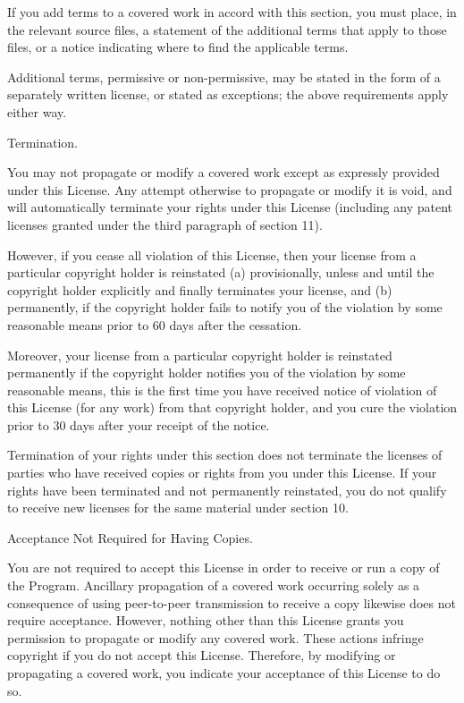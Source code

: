 If you add terms to a covered work in accord with this section, you must place, in the relevant source files, a statement of the additional terms that apply to those files, or a notice indicating where to find the applicable terms.

Additional terms, permissive or non-\/permissive, may be stated in the form of a separately written license, or stated as exceptions; the above requirements apply either way.


\begin{DoxyEnumerate}
\item Termination.
\end{DoxyEnumerate}

You may not propagate or modify a covered work except as expressly provided under this License. Any attempt otherwise to propagate or modify it is void, and will automatically terminate your rights under this License (including any patent licenses granted under the third paragraph of section 11).

However, if you cease all violation of this License, then your license from a particular copyright holder is reinstated (a) provisionally, unless and until the copyright holder explicitly and finally terminates your license, and (b) permanently, if the copyright holder fails to notify you of the violation by some reasonable means prior to 60 days after the cessation.

Moreover, your license from a particular copyright holder is reinstated permanently if the copyright holder notifies you of the violation by some reasonable means, this is the first time you have received notice of violation of this License (for any work) from that copyright holder, and you cure the violation prior to 30 days after your receipt of the notice.

Termination of your rights under this section does not terminate the licenses of parties who have received copies or rights from you under this License. If your rights have been terminated and not permanently reinstated, you do not qualify to receive new licenses for the same material under section 10.


\begin{DoxyEnumerate}
\item Acceptance Not Required for Having Copies.
\end{DoxyEnumerate}

You are not required to accept this License in order to receive or run a copy of the Program. Ancillary propagation of a covered work occurring solely as a consequence of using peer-\/to-\/peer transmission to receive a copy likewise does not require acceptance. However, nothing other than this License grants you permission to propagate or modify any covered work. These actions infringe copyright if you do not accept this License. Therefore, by modifying or propagating a covered work, you indicate your acceptance of this License to do so.


